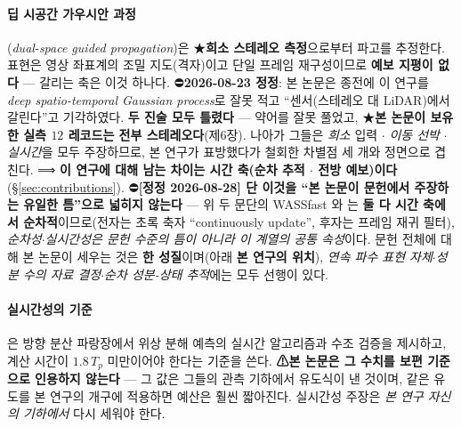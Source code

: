 \documentclass[11pt]{report}
\numberwithin{equation}{chapter}
\numberwithin{figure}{chapter}
\numberwithin{table}{chapter}
\begin{document}
\paragraph{딥 시공간 가우시안 과정}
\citet{DSGPNet2026}(\emph{dual-space guided propagation})은 ★\textbf{희소 스테레오
측정}으로부터 파고를 추정한다. 표현은 영상 좌표계의 조밀 지도(격자)이고 단일 프레임
재구성이므로 \textbf{예보 지평이 없다} --- 갈리는 축은 이것 하나다.
⛔\textbf{2026-08-23 정정}: 본 논문은 종전에 이 연구를 \emph{deep spatio-temporal
Gaussian process}로 잘못 적고 ``센서(스테레오 대 LiDAR)에서 갈린다''고 기각하였다.
\textbf{두 진술 모두 틀렸다} --- 약어를 잘못 풀었고, ★\textbf{본 논문이 보유한 실측
$12$ 레코드는 전부 스테레오다}(제6장). 나아가 그들은 \emph{희소} 입력 $\cdot$
\emph{이동 선박} $\cdot$ \emph{실시간}을 모두 주장하므로, 본 연구가 표방했다가 철회한
차별점 세 개와 정면으로 겹친다.
⟹ \textbf{이 연구에 대해 남는 차이는 시간 축(순차 추적 $\cdot$ 전방 예보)이다}
(\S\ref{sec:contributions}).
⛔\textbf{[정정 2026-08-28] 단 이것을 ``본 논문이 문헌에서 주장하는 유일한 틈''으로
넓히지 않는다} --- 위 두 문단의 WASSfast 와 \citet{Wang2025PointsToWaves} 는 \textbf{둘 다
시간 축에서 순차적}이므로(전자는 초록 축자 ``continuously update'', 후자는 프레임 재귀
필터), \emph{순차성$\cdot$실시간성은 문헌 수준의 틈이 아니라 이 계열의 공통 속성}이다.
문헌 전체에 대해 본 논문이 세우는 것은 \textbf{한 성질}이며(아래 \textbf{본 연구의
위치}), \emph{연속 파수 표현 자체}$\cdot$\emph{성분 수의 자료 결정}$\cdot$\emph{순차
성분-상태 추적}에는 모두 선행이 있다.

\paragraph{실시간성의 기준}
\citet{Kim2023RealTime}은 방향 분산 파랑장에서 위상 분해 예측의 실시간 알고리즘과
수조 검증을 제시하고, 계산 시간이 $1.8\,T_p$ 미만이어야 한다는 기준을 쓴다.
\textbf{⚠본 논문은 그 수치를 보편 기준으로 인용하지 않는다} --- 그 값은 그들의 관측
기하에서 유도식이 낸 것이며, 같은 유도를 본 연구의 개구에 적용하면 예산은 훨씬 짧아진다.
실시간성 주장은 \emph{본 연구 자신의 기하에서} 다시 세워야 한다.
\end{document}
